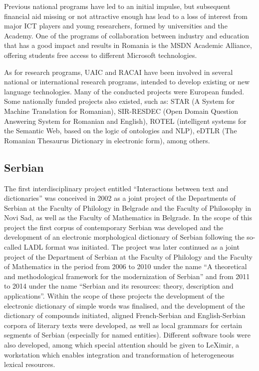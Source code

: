 \documentclass[10pt, plain]{../../metanetpaper}
\begin{document}
\begin{multicols}{2}
Previous national programs have led to an initial impulse, but subsequent financial aid missing or not attractive enough has lead to a loss of interest from major ICT players and young researchers, formed by universities and the Academy. One of the programs of collaboration between industry and education that has a good impact and results in Romania is the MSDN Academic Alliance, offering students free access to different Microsoft technologies.

As for research programs, UAIC and RACAI have been involved in several national or international research programs, intended to develop existing or new language technologies. Many of the conducted projects were European funded. Some nationally funded projects also existed, such as: STAR (A System for Machine Translation for Romanian), SIR-RESDEC (Open Domain Question Answering System for Romanian and English), ROTEL (intelligent systems for the Semantic Web, based on the logic of ontologies and NLP), eDTLR (The Romanian Thesaurus Dictionary in electronic form), among others.

\subsection*{Serbian}
\label{sec:serbian}

The first interdisciplinary project entitled “Interactions between text and dictionaries” was conceived in 2002 as a joint project of the Departments of Serbian at the Faculty of Philology in Belgrade and the Faculty of Philosophy in Novi Sad, as well as the Faculty of Mathematics in Belgrade. In the scope of this project the first corpus of contemporary Serbian was developed and the development of an electronic morphological dictionary of Serbian following the so-called LADL format was initiated.  The project was later continued as a joint project of the Department of Serbian at the Faculty of Philology and the Faculty of Mathematics in the period from 2006 to 2010 under the name “A theoretical and methodological framework for the modernization of Serbian” and from 2011 to 2014 under the name “Serbian and its resources: theory, description and applications”. Within the scope of these projects the development of the electronic dictionary of simple words was finalised, and the development of the dictionary of compounds initiated, aligned French-Serbian and English-Serbian corpora of literary texts were developed, as well as local grammars for certain segments of Serbian (especially for named entities). Different software tools were also developed, among which special attention should be given to LeXimir, a workstation which enables integration and transformation of heterogeneous lexical resources.


\end{multicols}
\end{document}
